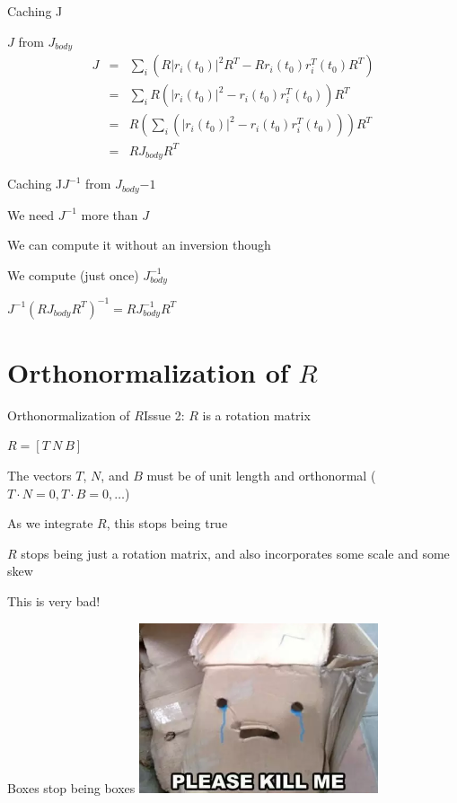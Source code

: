 \documentclass{beamer}
\begin{document}
\begin{frame}{Caching J}
\begin{block}{$J$ from $J_{body}$}
\begin{eqnarray}
J &=& \sum_i(R |r_i(t_0)|^2 R^T - R r_i(t_0) r_i^T(t_0) R^T) \\ %
&=& \sum_i R(|r_i(t_0)|^2 - r_i(t_0) r_i^T(t_0)) R^T \\ %
&=& R \left( \sum_i (|r_i(t_0)|^2 - r_i(t_0) r_i^T(t_0)) \right) R^T \\ %
&=& R J_{body} R^T
\end{eqnarray}
\end{block}
\end{frame}

\begin{slide}{Caching J}{$J^{-1}$ from $J_{body}{-1}$}{
\item We need $J^{-1}$ more than $J$
\item We can compute it without an inversion though
\item We compute (just once) $J_{body}^{-1}$
\item $J^{-1} (R J_{body} R^T)^{-1} = R J_{body}^{-1} R^T$
}\end{slide}

\section{Orthonormalization of $R$}
\begin{slide}{Orthonormalization of $R$}{Issue 2: $R$ is a rotation matrix}{
\item $R = [T\ N\ B]$
\item The vectors $T$, $N$, and $B$ must be of unit length and orthonormal ($T \cdot N = 0, T \cdot B = 0, \dots$)
\item As we integrate $R$, this stops being true
\item $R$ stops being just a rotation matrix, and also incorporates some scale and some skew
\item This is very bad!
}\end{slide}

\begin{frame}{Boxes stop being boxes}
\center
\includegraphics[height=5cm]{Pics/Kill_me_please.png}
\end{frame}
\end{document}
